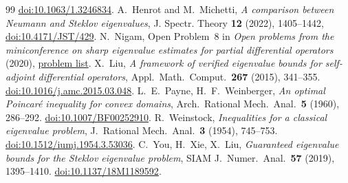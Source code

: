 \documentclass[11pt]{article}
\theoremstyle{definition}
\theoremstyle{remark}
\begin{document}
\begin{thebibliography}{99}
\href{https://doi.org/10.1063/1.3246834}{doi:10.1063/1.3246834}.
 A.~Henrot and M.~Michetti, \emph{A comparison between Neumann and Steklov eigenvalues},
J. Spectr. Theory \textbf{12} (2022), 1405--1442, \href{https://doi.org/10.4171/JST/429}{doi:10.4171/JST/429}.
 N.~Nigam, Open Problem~8 in \emph{Open problems from the miniconference on sharp eigenvalue estimates
for partial differential operators} (2020), \href{https://publish.illinois.edu/eigenvalues2020/files/2020/04/Open-problems.pdf}{problem list}.
 X.~Liu, \emph{A framework of verified eigenvalue bounds for self-adjoint differential operators}, Appl.\ Math.\ Comput.\ \textbf{267} (2015), 341--355.
\href{https://doi.org/10.1016/j.amc.2015.03.048}{doi:10.1016/j.amc.2015.03.048}.
 L.~E.~Payne, H.~F.~Weinberger, \emph{An optimal Poincar\'e inequality for convex domains}, Arch.\ Rational Mech.\ Anal.\ \textbf{5} (1960), 286--292.
\href{https://doi.org/10.1007/BF00252910}{doi:10.1007/BF00252910}.
 R.~Weinstock, \emph{Inequalities for a classical eigenvalue problem}, J.\ Rational Mech.\ Anal.\ \textbf{3} (1954), 745--753.
\href{https://doi.org/10.1512/iumj.1954.3.53036}{doi:10.1512/iumj.1954.3.53036}.
 C.~You, H.~Xie, X.~Liu, \emph{Guaranteed eigenvalue bounds for the Steklov eigenvalue problem}, SIAM J.\ Numer.\ Anal.\ \textbf{57} (2019), 1395--1410.
\href{https://doi.org/10.1137/18M1189592}{doi:10.1137/18M1189592}.
\end{thebibliography}
\end{document}
